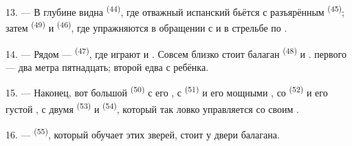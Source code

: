 13. --- В глубине видна  \textsuperscript{(44)}, где отважный
испанский  бьётся с разъярённым 
\textsuperscript{(45)}; затем  \textsuperscript{(49)} и
 \textsuperscript{(46)}, где упражняются в обращении с
 и в стрельбе по .

14. --- Рядом ---  \textsuperscript{(47)}, где играют
 и . Совсем близко стоит балаган
 \textsuperscript{(48)} и . 
первого --- два метра пятнадцать; второй едва с ребёнка.

15. --- Наконец, вот большой  \textsuperscript{(50)} с его
, с  \textsuperscript{(51)} и его мощными
, со  \textsuperscript{(52)} и его густой
, с двумя  \textsuperscript{(53)} и
 \textsuperscript{(54)}, который так ловко управляется со своим
.

16. ---  \textsuperscript{(55)}, который обучает этих зверей,
стоит у двери балагана.
\VUsaut{6.0mm}
\VUfilet{22mm}

